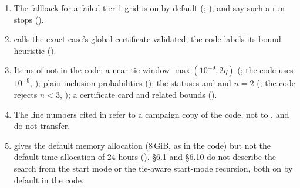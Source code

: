 \documentclass[11pt]{article}
\begin{document}
\begin{enumerate}[leftmargin=1.8em]
  \item The fallback for a failed tier-1 grid is on by default (; );
     and  say such a run stops ().
  \item {} calls the exact case's global certificate validated; the code labels its bound
    heuristic ().
  \item Items of  not in the code: a near-tie window $\max(10^{-9},2\eta)$ (; the code uses
    $10^{-9}$, ); plain inclusion probabilities (); the statuses
     and  and $n=2$ (; the code rejects $n<3$,
    ); a certificate card and related bounds ().
  \item The line numbers cited in  refer to a campaign copy of the code, not to
    , and do not transfer.
  \item {} gives the default memory allocation (8\,GiB, as in the code) but not the default time
    allocation of 24 hours ().  \S6.1 and \S6.10 do not describe the search from the start mode or
    the tie-aware start-mode recursion, both on by default in the code.
\end{enumerate}
\end{document}
